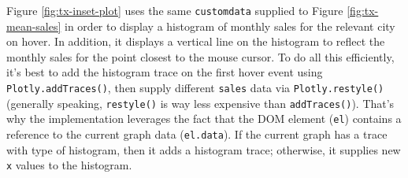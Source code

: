 \documentclass[
  12pt,
]{krantz}
\newenvironment{Shaded}{\begin{snugshade}}{\end{snugshade}}
\newcommand{\KeywordTok}[1]{\textcolor[rgb]{0.13,0.29,0.53}{\textbf{#1}}}
\newcommand{\NormalTok}[1]{#1}
\newcommand{\OperatorTok}[1]{\textcolor[rgb]{0.81,0.36,0.00}{\textbf{#1}}}
\newcommand{\StringTok}[1]{\textcolor[rgb]{0.31,0.60,0.02}{#1}}
\begin{document}
Figure \ref{fig:tx-inset-plot} uses the same \texttt{customdata} supplied to Figure \ref{fig:tx-mean-sales} in order to display a histogram of monthly sales for the relevant city on hover. In addition, it displays a vertical line on the histogram to reflect the monthly sales for the point closest to the mouse cursor. To do all this efficiently, it's best to add the histogram trace on the first hover event using \texttt{Plotly.addTraces()}, then supply different \texttt{sales} data via \texttt{Plotly.restyle()} (generally speaking, \texttt{restyle()} is way less expensive than \texttt{addTraces()}). That's why the implementation leverages the fact that the DOM element (\texttt{el}) contains a reference to the current graph data (\texttt{el.data}). If the current graph has a trace with type of histogram, then it adds a histogram trace; otherwise, it supplies new \texttt{x} values to the histogram.


\begin{Shaded}
\end{Shaded}
\end{document}
